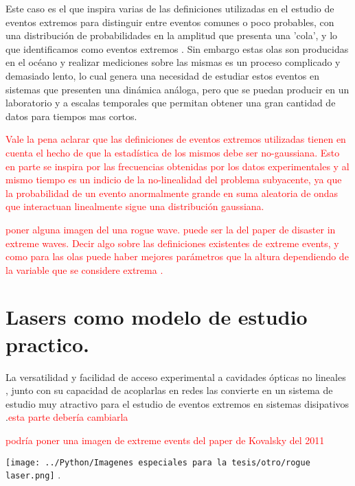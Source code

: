 		Este caso es el que inspira varias de las definiciones utilizadas en el estudio de eventos extremos para distinguir entre eventos comunes o poco probables, con una distribución  de probabilidades en la amplitud que presenta una 'cola',  y lo que identificamos como eventos extremos \cite{wave_disaster} . 
		Sin embargo estas olas son producidas en el océano y realizar mediciones sobre las mismas es un proceso complicado y demasiado lento, lo cual genera una necesidad de estudiar estos eventos en sistemas que presenten una dinámica análoga, pero que se puedan producir en un laboratorio y a escalas temporales que permitan obtener una gran cantidad de datos para tiempos mas cortos.
		
		\textcolor{red}{ Vale la pena aclarar que las definiciones de eventos extremos utilizadas tienen en cuenta el hecho de que la estadística de los mismos debe ser no-gaussiana. Esto en parte se inspira por las frecuencias obtenidas por los datos experimentales y al mismo tiempo es un indicio de la no-linealidad del problema subyacente, ya que la probabilidad de un evento anormalmente grande en suma aleatoria de ondas que interactuan linealmente sigue una distribución gaussiana.}
		
		
		
		\textcolor{red}{poner alguna imagen del una rogue wave. puede ser la del paper de disaster in extreme waves.}
		\textcolor{red}{Decir algo sobre las definiciones existentes de extreme events, y como para las olas puede haber mejores parámetros que la altura dependiendo de la variable que se considere extrema \cite{wave_disaster}.}
		
	\section{Lasers como modelo de estudio practico.}
	
		La versatilidad y facilidad de acceso experimental a cavidades ópticas no lineales , junto con su capacidad de acoplarlas en redes   las convierte en un sistema de estudio muy atractivo para el estudio de eventos extremos en sistemas disipativos .\textcolor{red}{esta parte debería cambiarla}
		
		\textcolor{red}{podría poner una imagen de extreme events del paper de Kovalsky del 2011}
		
		\begin{center}
			\texttt{[image: ../Python/Imagenes especiales para la tesis/otro/rogue laser.png]}
				.	
		\end{center}
		
